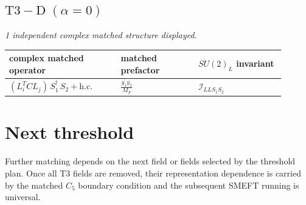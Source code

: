 \documentclass[9pt]{article}
\begin{document}
\subsection*{$ \mathrm{T3-D}\;(\alpha=0) $}
\textit{1 independent complex matched structure displayed. }
\begin{longtable}{@{}p{0.36\linewidth}p{0.25\linewidth}p{0.29\linewidth}@{}}
\toprule
complex matched operator & matched prefactor & $SU(2)_L$ invariant \\
\midrule
$ (L_i^T C L_j)\,S_1^\dagger\,S_2+\mathrm{h.c.} $ & $ \frac{\overline{y_{1}} \overline{y_{2}}}{M_F} $ & $ \mathcal{I}_{LLS_1S_2} $ \\
\bottomrule
\end{longtable}
\section*{Next threshold}
Further matching depends on the next field or fields selected by the threshold plan.  Once all T3 fields are removed, their representation dependence is carried by the matched $C_5$ boundary condition and the subsequent SMEFT running is universal.
\end{document}
